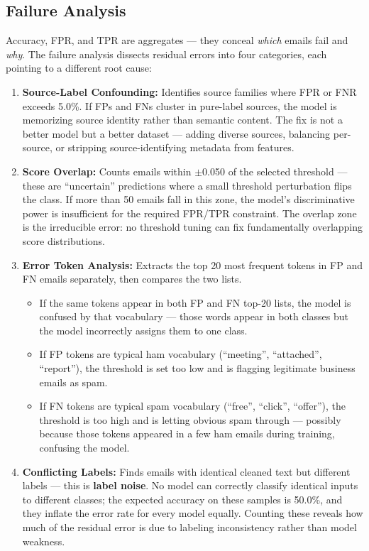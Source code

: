 \subsection{Failure Analysis}

Accuracy, FPR, and TPR are aggregates — they conceal \textit{which} emails fail and \textit{why}. The failure analysis dissects residual errors into four categories, each pointing to a different root cause:

\begin{enumerate}
  \item \textbf{Source-Label Confounding:} Identifies source families where FPR or FNR exceeds 5.0\%. If FPs and FNs cluster in pure-label sources, the model is memorizing source identity rather than semantic content. The fix is not a better model but a better dataset — adding diverse sources, balancing per-source, or stripping source-identifying metadata from features.
  \item \textbf{Score Overlap:} Counts emails within $\pm$0.050 of the selected threshold — these are ``uncertain'' predictions where a small threshold perturbation flips the class. If more than 50 emails fall in this zone, the model's discriminative power is insufficient for the required FPR/TPR constraint. The overlap zone is the irreducible error: no threshold tuning can fix fundamentally overlapping score distributions.
  \item \textbf{Error Token Analysis:} Extracts the top 20 most frequent tokens in FP and FN emails separately, then compares the two lists.
  \begin{itemize}
    \item If the same tokens appear in both FP and FN top-20 lists, the model is confused by that vocabulary — those words appear in both classes but the model incorrectly assigns them to one class.
    \item If FP tokens are typical ham vocabulary (``meeting'', ``attached'', ``report''), the threshold is set too low and is flagging legitimate business emails as spam.
    \item If FN tokens are typical spam vocabulary (``free'', ``click'', ``offer''), the threshold is too high and is letting obvious spam through — possibly because those tokens appeared in a few ham emails during training, confusing the model.
  \end{itemize}
  \item \textbf{Conflicting Labels:} Finds emails with identical cleaned text but different labels — this is \textbf{label noise}. No model can correctly classify identical inputs to different classes; the expected accuracy on these samples is 50.0\%, and they inflate the error rate for every model equally. Counting these reveals how much of the residual error is due to labeling inconsistency rather than model weakness.
\end{enumerate}

